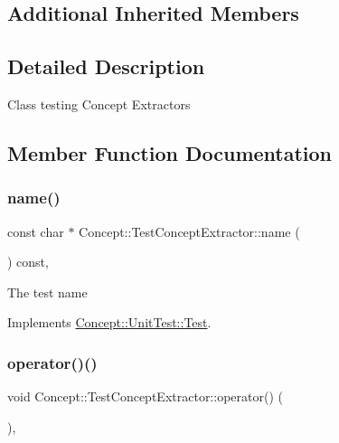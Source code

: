 \subsection*{Additional Inherited Members}


\subsection{Detailed Description}
Class testing Concept Extractors 

\subsection{Member Function Documentation}
\mbox{\label{class_concept_1_1_test_concept_extractor_a6b957e2b9689545c23e800e67e33196a}} 
\subsubsection{\texorpdfstring{name()}{name()}}
{\footnotesize\ttfamily const char $\ast$ Concept\+::\+Test\+Concept\+Extractor\+::name (\begin{DoxyParamCaption}{ }\end{DoxyParamCaption}) const\hspace{0.3cm}{\ttfamily [override]}, {\ttfamily [virtual]}}

The test name 

Implements \mbox{\hyperlink{class_concept_1_1_unit_test_1_1_test_a28c0cddd9719cd456fa92a142ae6c59d}{Concept\+::\+Unit\+Test\+::\+Test}}.

\mbox{\label{class_concept_1_1_test_concept_extractor_a32d377bd7d03420a7f470a840cd654cc}} 
\subsubsection{\texorpdfstring{operator()()}{operator()()}}
{\footnotesize\ttfamily void Concept\+::\+Test\+Concept\+Extractor\+::operator() (\begin{DoxyParamCaption}{ }\end{DoxyParamCaption})\hspace{0.3cm}{\ttfamily [override]}, {\ttfamily [virtual]}}


